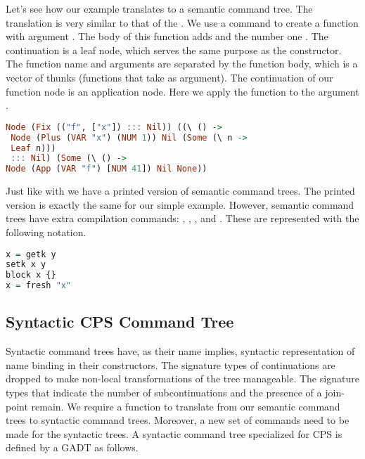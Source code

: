Let's see how our example  translates to a semantic command tree. The translation is very similar to that of the . We use a  command to create a function  with argument . The body of this function adds  and the number one . The continuation is a leaf node, which serves the same purpose as the  constructor. The function name and arguments are separated by the function body, which is a vector of thunks (functions that take \icode{()} as argument). The continuation of our function node is an application node. Here we apply the function  to the argument .
  
\begin{lstlisting}[language=Haskell]
Node (Fix (("f", ["x"]) ::: Nil)) ((\ () ->
 Node (Plus (VAR "x") (NUM 1)) Nil (Some (\ n ->
 Leaf n)))
 ::: Nil) (Some (\ () ->
Node (App (VAR "f") [NUM 41]) Nil None))
\end{lstlisting}

Just like with  we have a printed version of semantic command trees. The printed version is exactly the same for our simple example. However, semantic command trees have extra compilation commands: , , , and . These are represented with the following notation.

\begin{lstlisting}[language=Haskell]
x = getk y
setk x y
block x {}
x = fresh "x"
\end{lstlisting}

\subsection{\label{subsection:syntree}Syntactic CPS Command Tree}
Syntactic command trees have, as their name implies, syntactic representation of name binding in their constructors. The signature types of continuations are dropped to make non-local transformations of the tree manageable. The signature types that indicate the number of subcontinuations and the presence of a join-point remain. We require a function to translate from our semantic command trees to syntactic command trees. Moreover, a new set of commands need to be made for the syntactic trees. A syntactic command tree specialized for CPS  is defined by a GADT as follows.

\begin{lstlisting}[language=Haskell]
\end{lstlisting}

